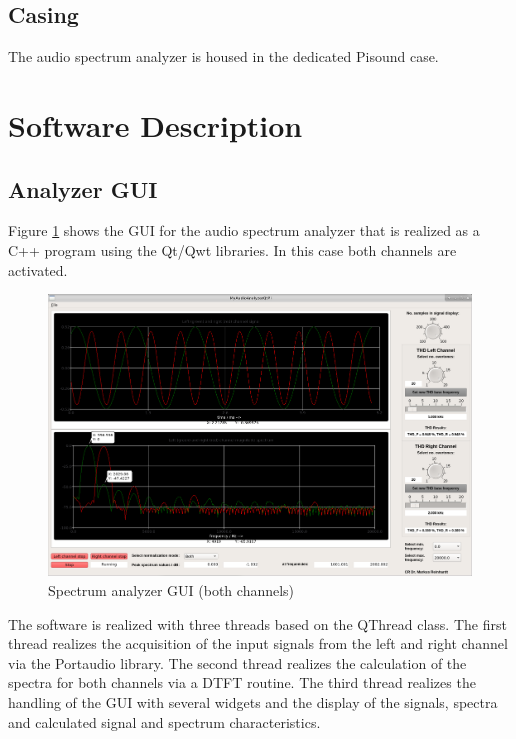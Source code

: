 \documentclass[11pt, oneside]{scrartcl}   	%
\begin{document}
\subsection{Casing}
The audio spectrum analyzer is housed in the dedicated Pisound case.

\newpage
\section{Software Description}
\subsection{Analyzer GUI}
Figure \ref{fig:SpectrumAnalyzerGUI} shows the GUI for the audio spectrum analyzer that is realized as a C++ program using the Qt/Qwt libraries. In this case both channels are activated.
\begin{figure}[tbph]
	\centering
	\includegraphics[width=\linewidth]{MyAudioSpectrumAnalyzerGUI.png}
	\caption[Spectrum analyzer GUI (both channels)]{Spectrum analyzer GUI (both channels)}
	\label{fig:SpectrumAnalyzerGUI}
\end{figure}

The software is realized with three threads based on the QThread class.
The first thread realizes the acquisition of the input signals from the left and right channel via the Portaudio library. The second thread realizes the calculation of the spectra for both channels via a DTFT routine. The third thread realizes the handling of the GUI with several widgets and the display of the signals, spectra and calculated signal and spectrum characteristics.  
\end{document}
